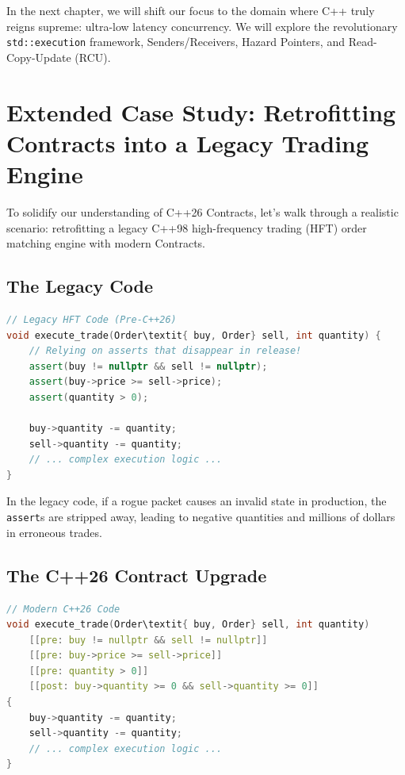 {{{{{{{{In the next chapter, we will shift our focus to the domain where C++ truly reigns supreme: ultra-low latency concurrency. We will explore the revolutionary \texttt{std::execution} framework, Senders/Receivers, Hazard Pointers, and Read-Copy-Update (RCU).

\section{Extended Case Study: Retrofitting Contracts into a Legacy Trading Engine}

To solidify our understanding of C++26 Contracts, let's walk through a realistic scenario: retrofitting a legacy C++98 high-frequency trading (HFT) order matching engine with modern Contracts.

\subsection{The Legacy Code}

\begin{lstlisting}[language=C++]
// Legacy HFT Code (Pre-C++26)
void execute_trade(Order\textit{ buy, Order} sell, int quantity) {
    // Relying on asserts that disappear in release!
    assert(buy != nullptr && sell != nullptr);
    assert(buy->price >= sell->price);
    assert(quantity > 0);
    
    buy->quantity -= quantity;
    sell->quantity -= quantity;
    // ... complex execution logic ...
}
\end{lstlisting}

In the legacy code, if a rogue packet causes an invalid state in production, the \texttt{assert}s are stripped away, leading to negative quantities and millions of dollars in erroneous trades.

\subsection{The C++26 Contract Upgrade}

\begin{lstlisting}[language=C++]
// Modern C++26 Code
void execute_trade(Order\textit{ buy, Order} sell, int quantity)
    [[pre: buy != nullptr && sell != nullptr]]
    [[pre: buy->price >= sell->price]]
    [[pre: quantity > 0]]
    [[post: buy->quantity >= 0 && sell->quantity >= 0]]
{
    buy->quantity -= quantity;
    sell->quantity -= quantity;
    // ... complex execution logic ...
}
\end{lstlisting}

}}}}}}}}
